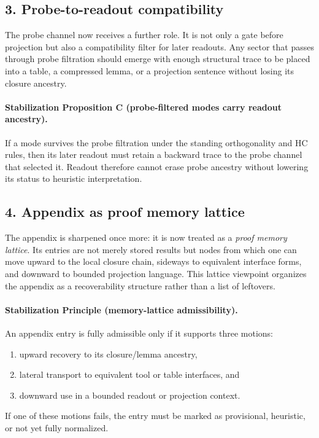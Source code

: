 \subsection*{3. Probe-to-readout compatibility}
The probe channel now receives a further role. It is not only a gate before
projection but also a compatibility filter for later readouts. Any sector that
passes through probe filtration should emerge with enough structural trace to be
placed into a table, a compressed lemma, or a projection sentence without losing
its closure ancestry.

\paragraph{Stabilization Proposition C (probe-filtered modes carry readout ancestry).}
If a mode survives the probe filtration under the standing orthogonality and HC
rules, then its later readout must retain a backward trace to the probe channel
that selected it. Readout therefore cannot erase probe ancestry without lowering
its status to heuristic interpretation.

\subsection*{4. Appendix as proof memory lattice}
The appendix is sharpened once more: it is now treated as a \emph{proof memory
lattice}. Its entries are not merely stored results but nodes from which one can
move upward to the local closure chain, sideways to equivalent interface forms,
and downward to bounded projection language. This lattice viewpoint organizes the
appendix as a recoverability structure rather than a list of leftovers.

\paragraph{Stabilization Principle (memory-lattice admissibility).}
An appendix entry is fully admissible only if it supports three motions:
\begin{enumerate}[leftmargin=2em,label=(\alph*)]
  \item upward recovery to its closure/lemma ancestry,
  \item lateral transport to equivalent tool or table interfaces, and
  \item downward use in a bounded readout or projection context.
\end{enumerate}
If one of these motions fails, the entry must be marked as provisional,
heuristic, or not yet fully normalized.

